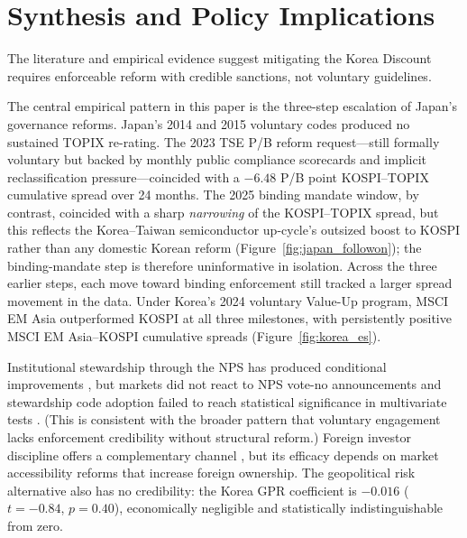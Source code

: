 \documentclass[12pt]{article}
\begin{document}
\section{Synthesis and Policy Implications}
\label{sec:synthesis}

The literature and empirical evidence suggest mitigating the Korea Discount requires enforceable reform with credible sanctions, not voluntary guidelines.

The central empirical pattern in this paper is the three-step escalation of Japan's governance reforms. Japan's 2014 and 2015 voluntary codes produced no sustained TOPIX re-rating. The 2023 TSE P/B reform request---still formally voluntary but backed by monthly public compliance scorecards and implicit reclassification pressure---coincided with a $-6.48$ P/B point KOSPI--TOPIX cumulative spread over 24 months. The 2025 binding mandate window, by contrast, coincided with a sharp \emph{narrowing} of the KOSPI--TOPIX spread, but this reflects the Korea--Taiwan semiconductor up-cycle's outsized boost to KOSPI rather than any domestic Korean reform (Figure~\ref{fig:japan_followon}); the binding-mandate step is therefore uninformative in isolation. Across the three earlier steps, each move toward binding enforcement still tracked a larger spread movement in the data. Under Korea's 2024 voluntary Value-Up program, MSCI EM Asia outperformed KOSPI at all three milestones, with persistently positive MSCI EM Asia--KOSPI cumulative spreads (Figure~\ref{fig:korea_es}).

Institutional stewardship through the NPS has produced conditional improvements \citep{kim2022nps_esg, lee2026esg}, but markets did not react to NPS vote-no announcements \citep{kim2014nps} and stewardship code adoption failed to reach statistical significance in multivariate tests \citep{park2021stewardship}. (This is consistent with the broader pattern that voluntary engagement lacks enforcement credibility without structural reform.) Foreign investor discipline offers a complementary channel \citep{joo2026foreign, kim2015foreign}, but its efficacy depends on market accessibility reforms that increase foreign ownership. The geopolitical risk alternative also has no credibility: the Korea GPR coefficient is $-0.016$ ($t=-0.84$, $p=0.40$), economically negligible and statistically indistinguishable from zero.
\end{document}
